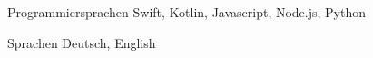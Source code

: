 

\begin{cvskills}
  \cvskill
    {Programmiersprachen} %
    {Swift, Kotlin, Javascript, Node.js, Python} %
	
  \cvskill
    {Sprachen} %
    {Deutsch, English} %

\end{cvskills}
